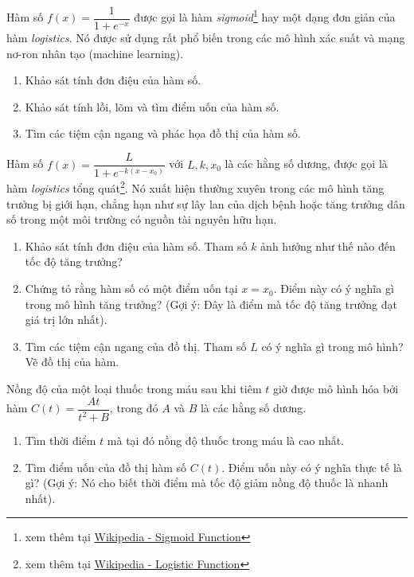 \begin{exercise}
Hàm số $f(x) = \dfrac{1}{1 + e^{-x}}$ được gọi là hàm \textit{sigmoid}\footnote{xem thêm tại \href{https://en.wikipedia.org/wiki/Sigmoid_function}{Wikipedia - Sigmoid Function}} hay một dạng đơn giản của hàm \textit{logistics}. Nó được sử dụng rất phổ biến trong các mô hình xác suất và mạng nơ-ron nhân tạo (machine learning).
\begin{enumerate}[label=(\alph*)]
    \item Khảo sát tính đơn điệu của hàm số.
    \item Khảo sát tính lồi, lõm và tìm điểm uốn của hàm số.
    \item Tìm các tiệm cận ngang và phác họa đồ thị của hàm số.
\end{enumerate}
\end{exercise}

\begin{exercise}
Hàm số $f(x) = \dfrac{L}{1 + e^{-k(x-x_0)}}$ với $L, k, x_0$ là các hằng số dương, được gọi là hàm \textit{logistics} tổng quát\footnote{xem thêm tại \href{https://en.wikipedia.org/wiki/Logistic_function}{Wikipedia - Logistic Function}}. Nó xuất hiện thường xuyên trong các mô hình tăng trưởng bị giới hạn, chẳng hạn như sự lây lan của dịch bệnh hoặc tăng trưởng dân số trong một môi trường có nguồn tài nguyên hữu hạn.
\begin{enumerate}[label=(\alph*)]
    \item Khảo sát tính đơn điệu của hàm số. Tham số $k$ ảnh hưởng như thế nào đến tốc độ tăng trưởng?
    \item Chứng tỏ rằng hàm số có một điểm uốn tại $x = x_0$. Điểm này có ý nghĩa gì trong mô hình tăng trưởng? (Gợi ý: Đây là điểm mà tốc độ tăng trưởng đạt giá trị lớn nhất).
    \item Tìm các tiệm cận ngang của đồ thị. Tham số $L$ có ý nghĩa gì trong mô hình? Vẽ đồ thị của hàm.
\end{enumerate}
\end{exercise}

\begin{exercise}
Nồng độ của một loại thuốc trong máu sau khi tiêm $t$ giờ được mô hình hóa bởi hàm $C(t) = \dfrac{At}{t^2 + B}$, trong đó $A$ và $B$ là các hằng số dương.
\begin{enumerate}[label=(\alph*)]
    \item Tìm thời điểm $t$ mà tại đó nồng độ thuốc trong máu là cao nhất.
    \item Tìm điểm uốn của đồ thị hàm số $C(t)$. Điểm uốn này có ý nghĩa thực tế là gì? (Gợi ý: Nó cho biết thời điểm mà tốc độ giảm nồng độ thuốc là nhanh nhất).
\end{enumerate}
\end{exercise}

